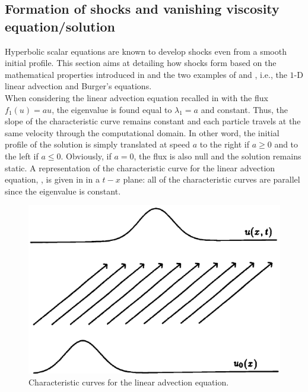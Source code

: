 \subsection{Formation of shocks and vanishing viscosity equation/solution}\label{sec:shock_form}
Hyperbolic scalar equations are known to develop shocks even from a smooth initial profile. This section aims at detailing how shocks form based on the mathematical properties introduced in  and the two examples of  and , i.e., the $1$-D linear advection and Burger's equations.\\

When considering the linear advection equation recalled in  with the flux $f_1(u) = au$, the eigenvalue is found equal to $\lambda_1=a$ and constant. Thus, the slope of the characteristic curve remains constant and each particle travels at the same velocity through the computational domain. In other word, the initial profile of the solution is simply translated at speed $a$ to the right if $a \geq 0$ and to the left if $a \leq 0$. Obviously, if $a=0$, the flux is also null and the solution remains static. A representation of the characteristic curve for the linear advection equation, , is given in  in a $t-x$ plane: all of the characteristic curves are parallel since the eigenvalue is constant.
%
\begin{figure}[H]
\centering
\includegraphics[width=\textwidth]{figures/charact_curves_linear_transport.png}
\caption{Characteristic curves for the linear advection equation.}
\label{fig:char_curve_sct1b}
\end{figure}
